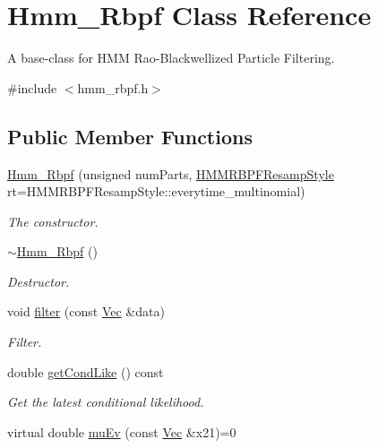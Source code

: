 \hypertarget{classHmm__Rbpf}{}\section{Hmm\+\_\+\+Rbpf Class Reference}
\label{classHmm__Rbpf}


A base-\/class for H\+MM Rao-\/\+Blackwellized Particle Filtering.  




{\ttfamily \#include $<$hmm\+\_\+rbpf.\+h$>$}

\subsection*{Public Member Functions}
\begin{DoxyCompactItemize}
\item 
\hyperlink{classHmm__Rbpf_aedf2a5840e7bd0a558aaa89603eab76e}{Hmm\+\_\+\+Rbpf} (unsigned num\+Parts, \hyperlink{hmm__rbpf_8h_aa0729d190f1f8b76b203466a41f1505f}{H\+M\+M\+R\+B\+P\+F\+Resamp\+Style} rt=H\+M\+M\+R\+B\+P\+F\+Resamp\+Style\+::everytime\+\_\+multinomial)
\begin{DoxyCompactList}\small\item\em The constructor. \end{DoxyCompactList}\item 
\hyperlink{classHmm__Rbpf_a5bcc8f6c36cbbb6e7fabfe85bca9136f}{$\sim$\+Hmm\+\_\+\+Rbpf} ()
\begin{DoxyCompactList}\small\item\em Destructor. \end{DoxyCompactList}\item 
void \hyperlink{classHmm__Rbpf_aa79770fd41c231cb1ff45726f4160e37}{filter} (const \hyperlink{pmfs_8h_a4c7df05c6f5e8a0d15ae14bcdbc07152}{Vec} \&data)
\begin{DoxyCompactList}\small\item\em Filter. \end{DoxyCompactList}\item 
double \hyperlink{classHmm__Rbpf_a413c03584961a6dfe6959900814b3705}{get\+Cond\+Like} () const 
\begin{DoxyCompactList}\small\item\em Get the latest conditional likelihood. \end{DoxyCompactList}\item 
virtual double \hyperlink{classHmm__Rbpf_a266a48b8a34268c966ac58b9be45a9be}{mu\+Ev} (const \hyperlink{pmfs_8h_a4c7df05c6f5e8a0d15ae14bcdbc07152}{Vec} \&x21)=0

\end{DoxyCompactItemize}
